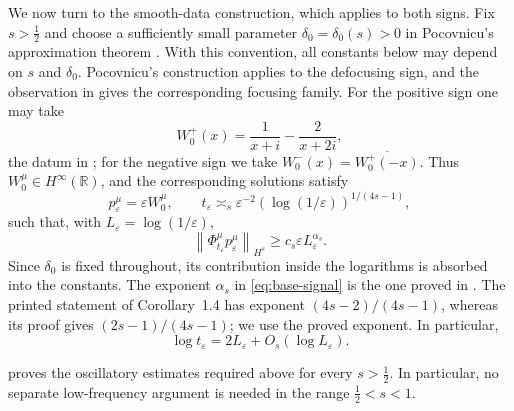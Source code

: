 \documentclass[11pt,reqno]{amsart}
\numberwithin{equation}{section}
\theoremstyle{remark}
\newcommand{\R}{\mathbb R}
\newcommand{\eps}{\varepsilon}
\newcommand{\half}{\frac12}
\newcommand{\norm}[1]{\left\lVert #1\right\rVert}
\newcommand{\flow}[1]{\Phi^{#1}}
\begin{document}
We now turn to the smooth-data construction, which applies to both signs.  Fix
$s>\half$ and choose a sufficiently small parameter
$\delta_0=\delta_0(s)>0$ in Pocovnicu's approximation theorem
\cite{PocovnicuApprox}.  With this convention, all constants below may depend
on $s$ and $\delta_0$.  Pocovnicu's construction applies to the defocusing
sign, and the observation in \cite[footnote~1]{GLPR} gives the corresponding
focusing family.  For the positive sign one may take
\[
 W_0^+(x)=\frac1{x+i}-\frac2{x+2i},
\]
the datum in \cite[Proposition~1.3]{PocovnicuApprox}; for the negative sign we
take $W_0^-(x)=\overline{W_0^+(-x)}$.  Thus $W_0^\mu\in H^\infty(\R)$, and the
corresponding solutions satisfy
\begin{equation}\label{eq:base-family}
 p_\eps^\mu=\eps W_0^\mu,
 \qquad
 t_\eps\asymp_s\eps^{-2}(\log(1/\eps))^{1/(4s-1)},
\end{equation}
such that, with $L_\eps=\log(1/\eps)$,
\begin{equation}\label{eq:base-signal}
 \norm{\flow\mu_{t_\eps}p_\eps^\mu}_{H^s}
 \geq c_s\eps L_\eps^{\alpha_s}.
\end{equation}
Since $\delta_0$ is fixed throughout, its contribution inside the logarithms
is absorbed into the constants.  The exponent $\alpha_s$ in
\eqref{eq:base-signal} is the one proved in
\cite[proof of Corollary~1.4, especially (2.20)--(2.21)]{PocovnicuApprox}.
The printed statement of Corollary~1.4 has exponent
$(4s-2)/(4s-1)$, whereas its proof gives $(2s-1)/(4s-1)$; we use the proved
exponent.  In
particular,
\begin{equation}\label{eq:base-time-log}
 \log t_\eps=2L_\eps+O_s(\log L_\eps).
\end{equation}

\cite[Lemma~2.2]{PocovnicuApprox} proves the oscillatory estimates required
above for every $s>\half$.  In particular, no separate low-frequency
argument is needed in the range $\half<s<1$.
\end{document}
